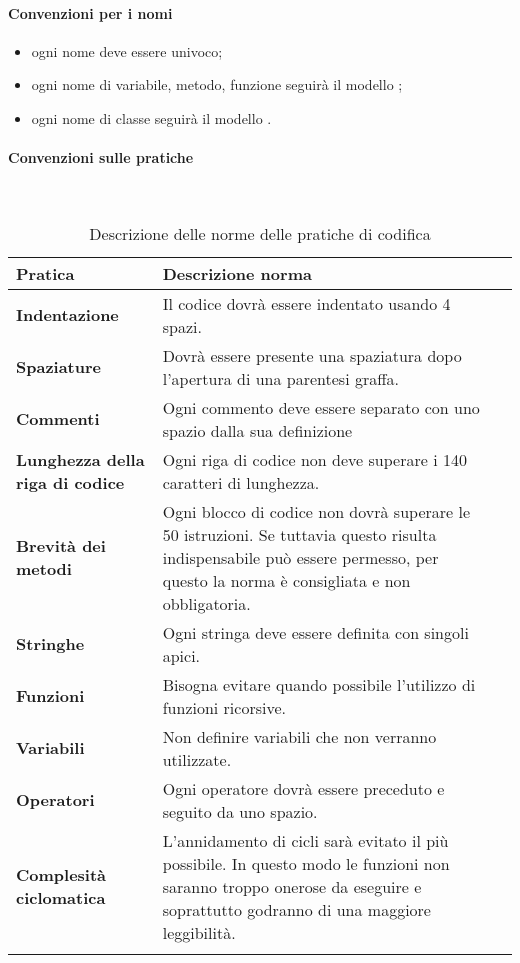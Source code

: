 \paragraph*{Convenzioni per i nomi}
\begin{itemize}
	\item ogni nome deve essere univoco;
	\item ogni nome di variabile, metodo, funzione seguirà il modello ;
	\item ogni nome di classe seguirà il modello .
\end{itemize}
\paragraph*{Convenzioni sulle pratiche}
\
{
	\setlength{\freewidth}{\dimexpr\textwidth-0\tabcolsep}
	\renewcommand{\arraystretch}{1.5}
	\setlength{\aboverulesep}{0pt}
	\setlength{\belowrulesep}{0pt}
	\begin{longtable}{L{.210\freewidth} L{.6\freewidth} L{.080\freewidth}}
		\toprule 
		\textbf{Pratica} & \textbf{Descrizione norma} \\
		\toprule
		\endhead		
		\textbf{Indentazione} & Il codice dovrà essere indentato usando 4 spazi. \\ 
		\textbf{Spaziature} & Dovrà essere presente una spaziatura dopo l'apertura di una parentesi graffa.  \\
		\textbf{Commenti} & Ogni commento deve essere separato con uno spazio dalla sua definizione \\ 
		\textbf{Lunghezza della riga di codice} & Ogni riga di codice non deve superare i 140 caratteri di lunghezza. \\
		\textbf{Brevità dei metodi} & Ogni blocco di codice non dovrà superare le 50 istruzioni. Se tuttavia questo risulta indispensabile può essere permesso, per questo la norma è consigliata e non obbligatoria.\\ 	
		\textbf{Stringhe} & Ogni stringa deve essere definita con singoli apici. \\
		\textbf{Funzioni} & Bisogna evitare quando possibile l'utilizzo di funzioni ricorsive.\\ 	
		\textbf{Variabili} & Non definire variabili che non verranno utilizzate.\\ 	
		\textbf{Operatori} & Ogni operatore dovrà essere preceduto e seguito da uno spazio.\\ 	
		\textbf{Complesità ciclomatica} & L'annidamento di cicli sarà evitato il più possibile. In questo modo le funzioni non saranno troppo onerose da eseguire e soprattutto godranno di una maggiore leggibilità. \\  			
		\bottomrule
		\hiderowcolors
		\caption{Descrizione delle norme delle pratiche di codifica}
	\end{longtable}
}
\newpage
